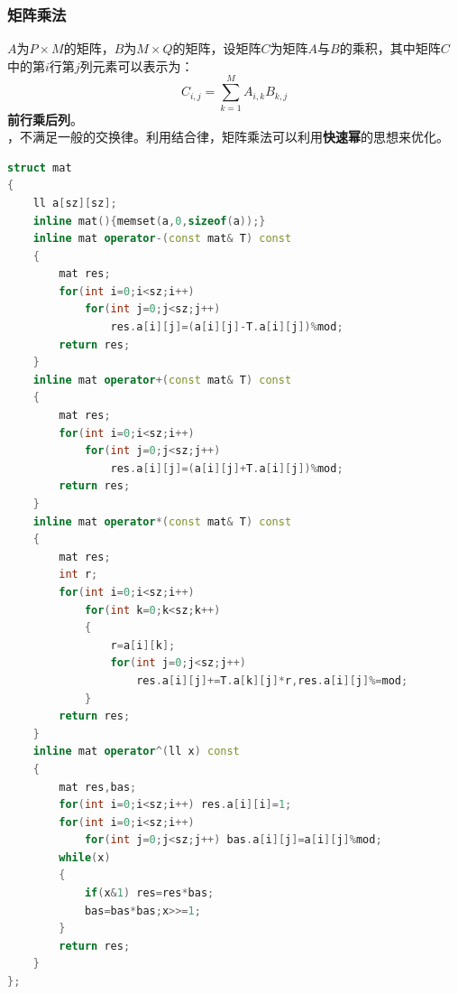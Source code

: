 \documentclass[a4paper]{book}
\begin{document}
\subsubsection{矩阵乘法}
$A$为$P\times M$的矩阵，$B$为$M\times Q$的矩阵，设矩阵$C$为矩阵$A$与$B$的乘积，其中矩阵$C$中的第$i$行第$j$列元素可以表示为：\\
$$
C_{i,j}=\displaystyle\sum_{k=1}^{M}A_{i,k}B_{k,j}
$$
\textbf{前行乘后列}。\\
，不满足一般的交换律。利用结合律，矩阵乘法可以利用\textbf{快速幂}的思想来优化。\\
\begin{lstlisting}[language=c++,title=使用二维数组模拟矩阵]
struct mat 
{
    ll a[sz][sz];
    inline mat(){memset(a,0,sizeof(a));}
    inline mat operator-(const mat& T) const 
    {
        mat res;
        for(int i=0;i<sz;i++)
            for(int j=0;j<sz;j++) 
                res.a[i][j]=(a[i][j]-T.a[i][j])%mod;
        return res;
    }
    inline mat operator+(const mat& T) const 
    {
        mat res;
        for(int i=0;i<sz;i++)
            for(int j=0;j<sz;j++) 
                res.a[i][j]=(a[i][j]+T.a[i][j])%mod;
        return res;
    }
    inline mat operator*(const mat& T) const 
    {
        mat res;
        int r;
        for(int i=0;i<sz;i++)
            for(int k=0;k<sz;k++) 
            {
                r=a[i][k];
                for(int j=0;j<sz;j++)
                    res.a[i][j]+=T.a[k][j]*r,res.a[i][j]%=mod;
            }
        return res;
    }
    inline mat operator^(ll x) const 
    {
        mat res,bas;
        for(int i=0;i<sz;i++) res.a[i][i]=1;
        for(int i=0;i<sz;i++)
            for(int j=0;j<sz;j++) bas.a[i][j]=a[i][j]%mod;
        while(x) 
        {
            if(x&1) res=res*bas;
            bas=bas*bas;x>>=1;
        }
        return res;
    }
};
\end{lstlisting}
\end{document}
